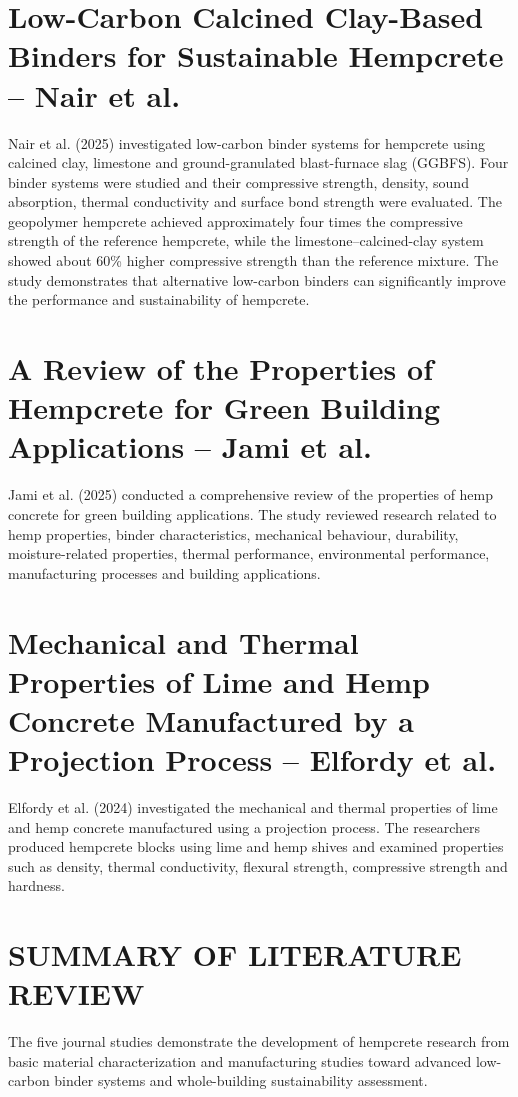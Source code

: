 \documentclass[12pt,a4paper,final]{report}
\begin{document}
\section*{Low-Carbon Calcined Clay-Based Binders for Sustainable Hempcrete -- Nair et al.}
Nair et al. (2025) investigated low-carbon binder systems for hempcrete using calcined clay,
limestone and ground-granulated blast-furnace slag (GGBFS). Four binder systems were
studied and their compressive strength, density, sound absorption, thermal conductivity and
surface bond strength were evaluated. The geopolymer hempcrete achieved approximately
four times the compressive strength of the reference hempcrete, while the limestone--calcined-clay
system showed about 60\% higher compressive strength than the reference mixture. The study
demonstrates that alternative low-carbon binders can significantly improve the performance
and sustainability of hempcrete.

\section*{A Review of the Properties of Hempcrete for Green Building Applications -- Jami et al.}
Jami et al. (2025) conducted a comprehensive review of the properties of hemp
concrete for green building applications. The study reviewed research related to hemp
properties, binder characteristics, mechanical behaviour, durability, moisture-related
properties, thermal performance, environmental performance, manufacturing processes and
building applications.

\section*{Mechanical and Thermal Properties of Lime and Hemp Concrete Manufactured by a Projection Process -- Elfordy et al.}
Elfordy et al. (2024) investigated the mechanical and thermal properties of lime and hemp
concrete manufactured using a projection process. The researchers produced hempcrete blocks
using lime and hemp shives and examined properties such as density, thermal conductivity,
flexural strength, compressive strength and hardness.

\section*{SUMMARY OF LITERATURE REVIEW}
The five journal studies demonstrate the development of hempcrete research from basic
material characterization and manufacturing studies toward advanced low-carbon binder
systems and whole-building sustainability assessment.
\end{document}
